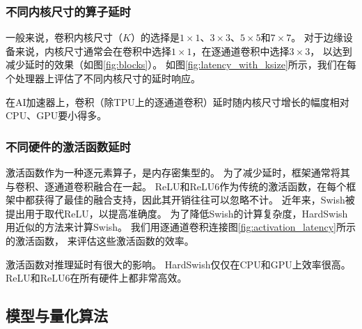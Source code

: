 \subsubsection{不同内核尺寸的算子延时}
\label{analysis:op block:op with ksize}


一般来说，卷积内核尺寸（$K$）的选择是$1\times 1$、$3\times 3$、$5\times 5$和$7\times 7$。
对于边缘设备来说，内核尺寸通常会在卷积中选择$1\times 1$，在逐通道卷积中选择$3\times 3$，
以达到减少延时的效果（如图\ref{fig:blocks}）。
如图\ref{fig:latency_with_ksize}所示，我们在每个处理器上评估了不同内核尺寸的延时响应。

\begin{finding}
    在AI加速器上，卷积（除TPU上的逐通道卷积）延时随内核尺寸增长的幅度相对CPU、GPU要小得多。
\end{finding}

\subsubsection{不同硬件的激活函数延时}
\label{analysis:op block:activation with hardware}


激活函数作为一种逐元素算子，是内存密集型的。
为了减少延时，框架通常将其与卷积、逐通道卷积融合在一起。
ReLU和ReLU6作为传统的激活函数，在每个框架中都获得了最佳的融合支持，因此其开销往往可以忽略不计。
近年来，Swish被提出用于取代ReLU，以提高准确度。
为了降低Swish的计算复杂度，HardSwish用近似的方法来计算Swish。
我们用逐通道卷积连接图\ref{fig:activation_latency}所示的激活函数，
来评估这些激活函数的效率。

\begin{finding}
    激活函数对推理延时有很大的影响。
    HardSwish仅仅在CPU和GPU上效率很高。
    ReLU和ReLU6在所有硬件上都非常高效。
\end{finding}

\subsection{模型与量化算法}
\label{analysis:model quantization}
